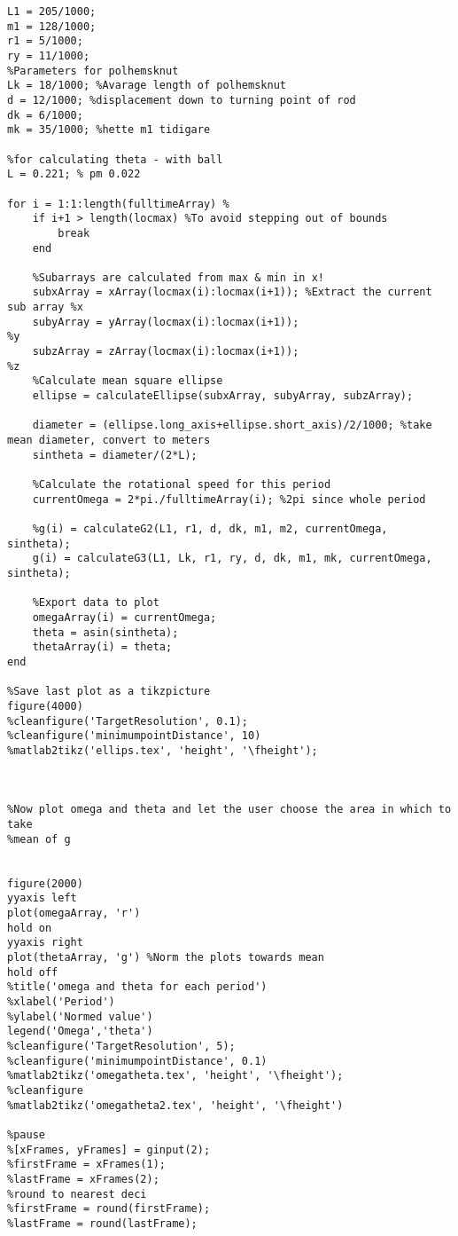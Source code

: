 \begin{lstlisting}[style=Matlab-editor]
%Parameters of pendulum
L1 = 205/1000;
m1 = 128/1000; 
r1 = 5/1000;
ry = 11/1000;
%Parameters for polhemsknut
Lk = 18/1000; %Avarage length of polhemsknut
d = 12/1000; %displacement down to turning point of rod
dk = 6/1000; 
mk = 35/1000; %hette m1 tidigare

%for calculating theta - with ball
L = 0.221; % pm 0.022

for i = 1:1:length(fulltimeArray) %
    if i+1 > length(locmax) %To avoid stepping out of bounds
        break
    end
    
    %Subarrays are calculated from max & min in x!
    subxArray = xArray(locmax(i):locmax(i+1)); %Extract the current sub array %x
    subyArray = yArray(locmax(i):locmax(i+1));                                %y
    subzArray = zArray(locmax(i):locmax(i+1));                                %z
    %Calculate mean square ellipse
    ellipse = calculateEllipse(subxArray, subyArray, subzArray);
   
    diameter = (ellipse.long_axis+ellipse.short_axis)/2/1000; %take mean diameter, convert to meters
    sintheta = diameter/(2*L);
    
    %Calculate the rotational speed for this period
    currentOmega = 2*pi./fulltimeArray(i); %2pi since whole period
    
    %g(i) = calculateG2(L1, r1, d, dk, m1, m2, currentOmega, sintheta);
    g(i) = calculateG3(L1, Lk, r1, ry, d, dk, m1, mk, currentOmega, sintheta);
    
    %Export data to plot
    omegaArray(i) = currentOmega;
    theta = asin(sintheta);
    thetaArray(i) = theta;
end

%Save last plot as a tikzpicture
figure(4000)
%cleanfigure('TargetResolution', 0.1);
%cleanfigure('minimumpointDistance', 10)
%matlab2tikz('ellips.tex', 'height', '\fheight');



%Now plot omega and theta and let the user choose the area in which to take
%mean of g


figure(2000)
yyaxis left
plot(omegaArray, 'r')
hold on
yyaxis right
plot(thetaArray, 'g') %Norm the plots towards mean 
hold off
%title('omega and theta for each period')
%xlabel('Period')
%ylabel('Normed value')
legend('Omega','theta')
%cleanfigure('TargetResolution', 5);
%cleanfigure('minimumpointDistance', 0.1)
%matlab2tikz('omegatheta.tex', 'height', '\fheight');
%cleanfigure
%matlab2tikz('omegatheta2.tex', 'height', '\fheight')

%pause
%[xFrames, yFrames] = ginput(2);
%firstFrame = xFrames(1);
%lastFrame = xFrames(2);
%round to nearest deci
%firstFrame = round(firstFrame);
%lastFrame = round(lastFrame);


\end{lstlisting}
